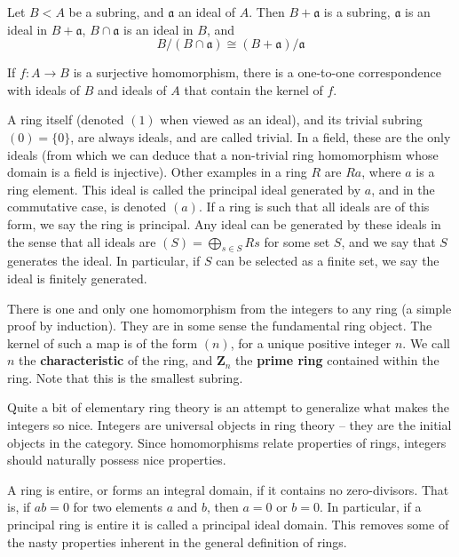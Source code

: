 \begin{theorem}
    Let $B < A$ be a subring, and $\mathfrak{a}$ an ideal of $A$. Then $B + \mathfrak{a}$ is a subring, $\mathfrak{a}$ is an ideal in $B + \mathfrak{a}$, $B \cap \mathfrak{a}$ is an ideal in $B$, and
    \[ B/(B \cap \mathfrak{a}) \cong (B + \mathfrak{a})/\mathfrak{a} \]
\end{theorem}

\begin{theorem}
    If $f:A \to B$ is a surjective homomorphism, there is a one-to-one correspondence with ideals of $B$ and ideals of $A$ that contain the kernel of $f$.
\end{theorem}

A ring itself (denoted $(1)$ when viewed as an ideal), and its trivial subring $(0) = \{ 0 \}$, are always ideals, and are called trivial. In a field, these are the only ideals (from which we can deduce that a non-trivial ring homomorphism whose domain is a field is injective). Other examples in a ring $R$ are $Ra$, where $a$ is a ring element. This ideal is called the principal ideal generated by $a$, and in the commutative case, is denoted $(a)$. If a ring is such that all ideals are of this form, we say the ring is principal. Any ideal can be generated by these ideals in the sense that all ideals are $(S) = \bigoplus_{s \in S} Rs$ for some set $S$, and we say that $S$ generates the ideal. In particular, if $S$ can be selected as a finite set, we say the ideal is finitely generated.

There is one and only one homomorphism from the integers to any ring (a simple proof by induction). They are in some sense the fundamental ring object. The kernel of such a map is of the form $(n)$, for a unique positive integer $n$. We call $n$ the {\bf characteristic} of the ring, and $\mathbf{Z}_n$ the {\bf prime ring} contained within the ring. Note that this is the smallest subring.

Quite a bit of elementary ring theory is an attempt to generalize what makes the integers so nice. Integers are universal objects in ring theory -- they are the initial objects in the category. Since homomorphisms relate properties of rings, integers should naturally possess nice properties.

A ring is entire, or forms an integral domain, if it contains no zero-divisors. That is, if $ab = 0$ for two elements $a$ and $b$, then $a = 0$ or $b = 0$. In particular, if a principal ring is entire it is called a principal ideal domain. This removes some of the nasty properties inherent in the general definition of rings.

